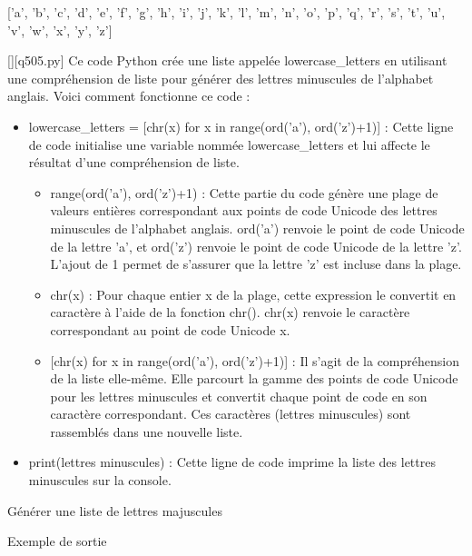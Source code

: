 ['a', 'b', 'c', 'd', 'e', 'f', 'g', 'h', 'i', 'j', 'k', 'l', 'm', 'n', 'o', 'p', 'q', 'r', 's', 't', 'u', 'v', 'w', 'x', 'y', 'z']
        \par
        \begin{solution}
            \renewcommand{\nomfichier}{q505.py}
            \pythonfile{\chemincode \nomfichier}[][\nomfichier]
            Ce code Python crée une liste appelée lowercase\_letters en utilisant une compréhension de liste pour générer des lettres minuscules de l'alphabet anglais. Voici comment fonctionne ce code :\par

 \begin{itemize}
 \item    lowercase\_letters = [chr(x) for x in range(ord('a'), ord('z')+1)] : Cette ligne de code initialise une variable nommée lowercase\_letters et lui affecte le résultat d'une compréhension de liste.

 \begin{itemize}
 \item        range(ord('a'), ord('z')+1) : Cette partie du code génère une plage de valeurs entières correspondant aux points de code Unicode des lettres minuscules de l'alphabet anglais. ord('a') renvoie le point de code Unicode de la lettre 'a', et ord('z') renvoie le point de code Unicode de la lettre 'z'. L'ajout de 1 permet de s'assurer que la lettre 'z' est incluse dans la plage.
 \item         chr(x) : Pour chaque entier x de la plage, cette expression le convertit en caractère à l'aide de la fonction chr(). chr(x) renvoie le caractère correspondant au point de code Unicode x.
 \item{}         [chr(x) for x in range(ord('a'), ord('z')+1)] : Il s'agit de la compréhension de la liste elle-même. Elle parcourt la gamme des points de code Unicode pour les lettres minuscules et convertit chaque point de code en son caractère correspondant. Ces caractères (lettres minuscules) sont rassemblés dans une nouvelle liste.
 \end{itemize}
 \item   print(lettres minuscules) : Cette ligne de code imprime la liste des lettres minuscules sur la console. 
 \end{itemize}
        \end{solution}
        

        \question
        Générer une liste de lettres majuscules

Exemple de sortie

